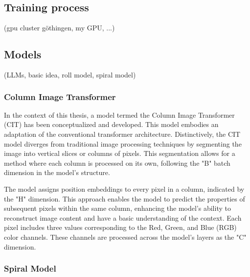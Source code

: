 \subsection{Training process}
    (gpu cluster göthingen, my GPU, ...)

\subsection{Models}
    (LLMs, basic idea, roll model, spiral model)

    \subsubsection{Column Image Transformer}

    In the context of this thesis, a model termed the Column Image Transformer (CIT) has been conceptualized and developed. This model embodies an adaptation of the conventional transformer architecture. Distinctively, the CIT model diverges from traditional image processing techniques by segmenting the image into vertical slices or columns of pixels. This segmentation allows for a method where each column is processed on its own, following the "B" batch dimension in the model's structure.

    The model assigns position embeddings to every pixel in a column, indicated by the "H" dimension. This approach enables the model to predict the properties of subsequent pixels within the same column, enhancing the model's ability to reconstruct image content and have a basic understanding of the context. Each pixel includes three values corresponding to the Red, Green, and Blue (RGB) color channels. These channels are processed across the model's layers as the "C" dimension.

    \subsubsection{Spiral Model}